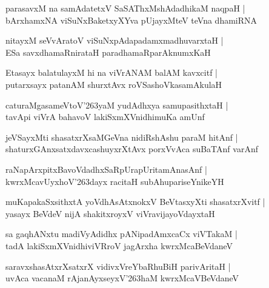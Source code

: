 \documentclass[twoside,12pt,openright]{book}
\def\S{\char'263}
\newcounter{shloka}[chapter]
\begin{document}
\begin{shloka}%
parasavxM na samAdatetxV SaSAThxMshAdadhikaM naqpaH |\\
bArxhamxNA viSuNxBaketxyXYva pUjayxMteV teVna dhamiRNA
\end{shloka}

\begin{shloka}%
nitayxM seVvAratoV viSuNxpAdapadamxmadhuvarxtaH |\\
ESa savxdhamaRnirataH paradhamaRparAknumxKaH 
\end{shloka}

\begin{shloka}%
Etasayx balatulayxM hi na viVrANAM balAM kavxcitf |\\
putarxsayx patanAM shurxtAvx roVSashoVkasamAkulaH 
\end{shloka}

\begin{shloka}%
caturaMgasameVtoV\S yaM yudAdhxya samupasithxtaH |\\
tavApi viVrA bahavoV lakiSxmXVnidhimuKa amUnf 
\end{shloka}

\begin{shloka}%
jeVSayxMti shasatxrXsaMGeVna nidiRshAshu paraM hitAnf |\\
shaturxGAnxsatxdavxcashuyxrXtAvx porxVvAca suBaTAnf varAnf 
\end{shloka}

\begin{shloka}%
raNapArxpitxBavoVdadhxSaRpUrapUritamAnasAnf |\\
kwrxMcavUyxhoV\S dayx racitaH subAhupariseYnikeYH 
\end{shloka}

\begin{shloka}%
muKapakaSxsithxtA yoVdhAsAtxnokxV BeVtasxyXti shasatxrXvitf |\\
yasayx BeVdeV nijA shakitxroyxV viVravijayoVdayxtaH 
\end{shloka}

\begin{shloka}%
sa gaqhANxtu madiVyAdidhx pANipadAmxcaCx viVTakaM |\\
tadA lakiSxmXVnidhiviVRroV jagArxha kwrxMcaBeVdaneV 
\end{shloka}

\begin{shloka}%
saravxshasAtxrXsatxrX vidivxVreYbaRhuBiH parivAritaH |\\
uvAca vacanaM rAjanAyxseyxV\S haM kwrxMcaVBeVdaneV 
\end{shloka}
\end{document}

